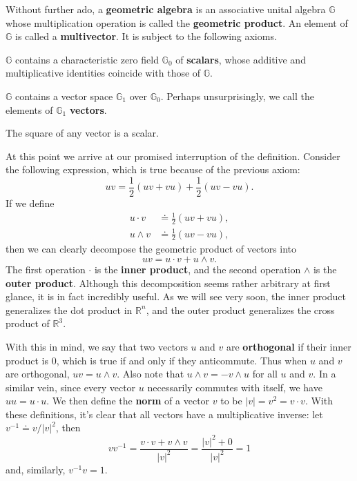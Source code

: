 \documentclass[twoside,10pt]{article}
\begin{document}
Without further ado, a \textbf{geometric algebra} is an associative unital algebra $\mathbb{G}$ whose multiplication operation is called the \textbf{geometric product}. An element of $\mathbb{G}$ is called a \textbf{multivector}. It is subject to the following axioms.

\begin{axiom}
	$\mathbb{G}$ contains a characteristic zero field $\mathbb{G}_0$ of \textbf{scalars}, whose additive and multiplicative identities coincide with those of $\mathbb{G}$.
\end{axiom}

\begin{axiom}
	$\mathbb{G}$ contains a vector space $\mathbb{G}_{1}$ over $\mathbb{G}_{0}$. Perhaps unsurprisingly, we call the elements of $\mathbb{G}_{1}$ \textbf{vectors}.
\end{axiom}

\begin{axiom}
	The square of any vector is a scalar.
\end{axiom}

At this point we arrive at our promised interruption of the definition. Consider the following expression, which is true because of the previous axiom:
\[
	uv = \frac{1}{2} (uv+vu) + \frac{1}{2} (uv-vu).
\] 
If we define
\begin{align*}
	u \cdot v &\doteq \frac{1}{2} (uv+vu), \\
	u \wedge v &\doteq \frac{1}{2} (uv-vu),
\end{align*}
then we can clearly decompose the geometric product of vectors into
\[
uv = u \cdot v + u \wedge v.
\] 
The first operation $\cdot$ is the \textbf{inner product}, and the second operation $\wedge$ is the \textbf{outer product}. Although this decomposition seems rather arbitrary at first glance, it is in fact incredibly useful. As we will see very soon, the inner product generalizes the dot product in $\mathbb{R}^{n}$, and the outer product generalizes the cross product of $\mathbb{R}^{3}$.

With this in mind, we say that two vectors $u$ and $v$ are \textbf{orthogonal} if their inner product is 0, which is true if and only if they anticommute. Thus when $u$ and $v$ are orthogonal, $uv = u \wedge v$. Also note that $u \wedge v = -v \wedge u$ for all $u$ and $v$. In a similar vein, since every vector $u$ necessarily commutes with itself, we have $uu = u \cdot u$. We then define the \textbf{norm} of a vector $v$ to be $|v| = v^2 = v\cdot v$. With these definitions, it's clear that all vectors have a multiplicative inverse: let $v^{-1} \doteq v/|v|^2$, then
\[
v v^{-1} = \frac{v\cdot v + v \wedge v}{|v|^2} = \frac{|v|^2 + 0}{|v|^2} =1
\] and, similarly, $v^{-1}v=1$.
\end{document}
